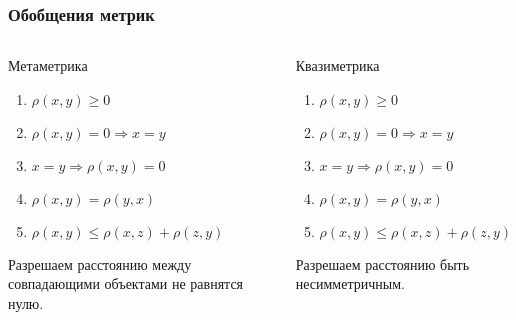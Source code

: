 \documentclass[10pt]{beamer}
\begin{document}
\begin{frame}
\frametitle{Обобщения метрик}


\begin{columns}[t] %

\begin{block}{Метаметрика}
\begin{enumerate}
	\item $\rho(x, y) \geqslant 0$
	\item $\rho(x, y) = 0 \Rightarrow x = y$
	\item \sout{$x = y \Rightarrow \rho(x, y) = 0$}
	\item $\rho(x, y) = \rho(y, x)$
	\item $\rho(x, y) \leqslant \rho(x, z) + \rho(z, y)$
\end{enumerate}

\vspace{\baselineskip}
Разрешаем расстоянию между совпадающими объектами не равнятся нулю.
\end{block} 

\begin{block}{Квазиметрика}
\begin{enumerate}
	\item $\rho(x, y) \geqslant 0$
	\item $\rho(x, y) = 0 \Rightarrow x = y$
	\item $x = y \Rightarrow \rho(x, y) = 0$
	\item \sout{$\rho(x, y) = \rho(y, x)$}
	\item $\rho(x, y) \leqslant \rho(x, z) + \rho(z, y)$
\end{enumerate}

\vspace{\baselineskip}
Разрешаем расстоянию быть несимметричным.
\end{block} 

\end{columns}

\end{frame}


\end{document}
